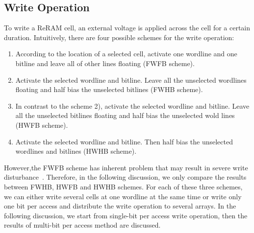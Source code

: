 \subsection{Write Operation}
To write a ReRAM cell, an external voltage is applied across the cell for
a certain duration. Intuitively, there are four possible schemes for the
write operation:
\begin{enumerate}
  \item According to the location of a selected cell, activate one
      wordline and one bitline and leave all of other lines floating
      (FWFB scheme).
  \item Activate the selected wordline and bitline. Leave all the
      unselected wordlines floating and half bias the unselected
      bitlines (FWHB scheme).
  \item In contrast to the scheme 2), activate the selected wordline
      and bitline. Leave all the unselected bitlines floating and half
      bias the unselected wold lines (HWFB scheme).
  \item Activate the selected wordline and bitline. Then half bias the
      unselected wordlines and bitlines (HWHB scheme).
\end{enumerate}
However,the FWFB scheme has inherent problem that may result in severe
write disturbance~\cite{crossbar_NANO2003_Ziegler}. Therefore, in the
following discussion, we only compare the results between FWHB, HWFB and
HWHB schemes. For each of these three schemes, we can either write several
cells at one wordline at the same time or write only one bit per access
and distribute the write operation to several arrays. In the following
discussion, we start from single-bit per access write operation, then the
results of multi-bit per access method are discussed.

